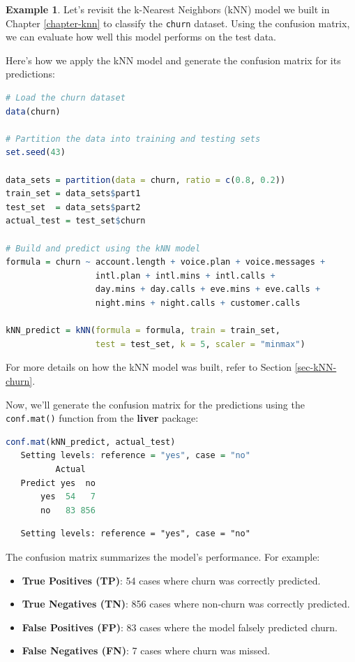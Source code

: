 \documentclass[
]{book}
\newcommand{\passthrough}[1]{#1}
\providecommand{\tightlist}{%
  \setlength{\itemsep}{0pt}\setlength{\parskip}{0pt}}
\theoremstyle{definition}
\theoremstyle{definition}
\newtheorem{example}{Example}[chapter]
\theoremstyle{definition}
\theoremstyle{definition}
\theoremstyle{remark}
\begin{document}
\begin{example}
\protect\hypertarget{exm:ex-confusion-matrix-kNN}{}\label{exm:ex-confusion-matrix-kNN}Let's revisit the k-Nearest Neighbors (kNN) model we built in Chapter \ref{chapter-knn} to classify the \passthrough{\lstinline!churn!} dataset. Using the confusion matrix, we can evaluate how well this model performs on the test data.

Here's how we apply the kNN model and generate the confusion matrix for its predictions:

\begin{lstlisting}[language=R]
# Load the churn dataset
data(churn)

# Partition the data into training and testing sets
set.seed(43)

data_sets = partition(data = churn, ratio = c(0.8, 0.2))
train_set = data_sets$part1
test_set  = data_sets$part2
actual_test = test_set$churn

# Build and predict using the kNN model
formula = churn ~ account.length + voice.plan + voice.messages + 
                  intl.plan + intl.mins + intl.calls + 
                  day.mins + day.calls + eve.mins + eve.calls + 
                  night.mins + night.calls + customer.calls

kNN_predict = kNN(formula = formula, train = train_set, 
                  test = test_set, k = 5, scaler = "minmax")
\end{lstlisting}

For more details on how the kNN model was built, refer to Section \ref{sec-kNN-churn}.

Now, we'll generate the confusion matrix for the predictions using the \passthrough{\lstinline!conf.mat()!} function from the \textbf{liver} package:

\begin{lstlisting}[language=R]
conf.mat(kNN_predict, actual_test)
   Setting levels: reference = "yes", case = "no"
          Actual
   Predict yes  no
       yes  54   7
       no   83 856
\end{lstlisting}

\begin{lstlisting}
   Setting levels: reference = "yes", case = "no"
\end{lstlisting}

The confusion matrix summarizes the model's performance. For example:

\begin{itemize}
\tightlist
\item
  \textbf{True Positives (TP)}: 54 cases where churn was correctly predicted.\\
\item
  \textbf{True Negatives (TN)}: 856 cases where non-churn was correctly predicted.\\
\item
  \textbf{False Positives (FP)}: 83 cases where the model falsely predicted churn.\\
\item
  \textbf{False Negatives (FN)}: 7 cases where churn was missed.
\end{itemize}


\end{example}
\end{document}
